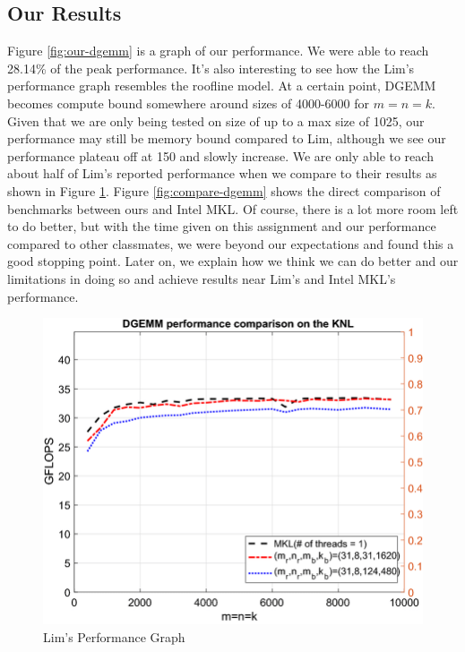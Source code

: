 \documentclass{article}
\begin{document}
\subsection{Our Results}
Figure \ref{fig:our-dgemm} is a graph of our performance. We were able to reach 28.14\% of the peak performance. It's also interesting to see how the Lim's performance graph resembles the roofline model. At a certain point, DGEMM becomes compute bound somewhere around sizes of 4000-6000 for $m=n=k$. Given that we are only being tested on size of up to a max size of 1025, our performance may still be memory bound compared to Lim, although we see our performance plateau off at 150 and slowly increase. We are only able to reach about half of Lim's reported performance when we compare to their results as shown in Figure \ref{fig:lim-dgemm}. Figure \ref{fig:compare-dgemm} shows the direct comparison of benchmarks between ours and Intel MKL. Of course, there is a lot more room left to do better, but with the time given on this assignment and our performance compared to other classmates, we were beyond our expectations and found this a good stopping point. Later on, we explain how we think we can do better and our limitations in doing so and achieve results near Lim's and Intel MKL's performance.

\begin{figure}[H]
  \centerline{\includegraphics[width=6in]{figures/DGEMM-performance-comparison-for-different-matrix-sizes-on-the-KNL.png}}
  \caption{Lim's Performance Graph \cite{10.1007/s10586-018-2810-y}}
  \label{fig:lim-dgemm}
\end{figure}
\end{document}

